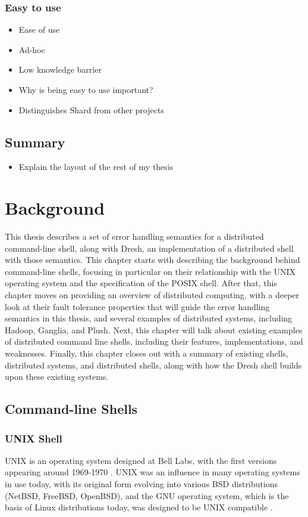 \documentclass[twoside]{report}
\begin{document}
\subsection{Easy to use}
\begin{itemize}
  \item Ease of use
  \item Ad-hoc
  \item Low knowledge barrier
  \item Why is being easy to use important?
  \item Distinguishes Shard from other projects
\end{itemize}

\section{Summary}
\begin{itemize}
  \item Explain the layout of the rest of my thesis
\end{itemize}


\chapter{Background}

This thesis describes a set of error handling semantics for a distributed command-line shell, along with Dresh, an implementation of a distributed shell with those semantics.
This chapter starts with describing the background behind command-line shells, focusing in particular on their relationship with the UNIX operating system and the specification of the POSIX shell.
After that, this chapter moves on providing an overview of distributed computing, with a deeper look at their fault tolerance properties that will guide the error handling semantics in this thesis, and several examples of distributed systems, including Hadoop, Ganglia, and Plush.
Next, this chapter will talk about existing examples of distributed command line shells, including their features, implementations, and weaknesses.
Finally, this chapter closes out with a summary of existing shells, distributed systems, and distributed shells, along with how the Dresh shell builds upon these existing systems.

\section{Command-line Shells}
\subsection{UNIX Shell}
UNIX is an operating system designed at Bell Labs, with the first versions appearing around 1969-1970 \cite{10.1145/361011.361061}.
UNIX was an influence in many operating systems in use today, with its original form evolving into various BSD distributions (NetBSD, FreeBSD, OpenBSD), and the GNU operating system, which is the basis of Linux distributions today, was designed to be UNIX compatible \cite{bretthauer2001open}.
\end{document}
